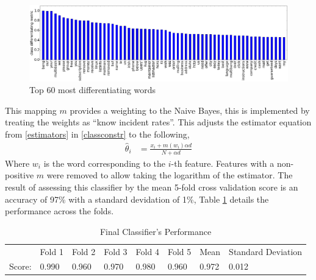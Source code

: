 \documentclass[12pt, a4paper]{article}
\begin{document}
  \begin{figure}[H]
    \caption{Top 60 most differentiating words}
    \label{wordprobsham}
    \vspace{-0.2cm}
    \centering
    \includegraphics[width=1\linewidth]{report_images/word_probs_diff}
  \end{figure}

	\begin{minipage}{\linewidth}

	This mapping $m$ provides a weighting to the Naive Bayes, this is implemented by treating the weights as ``know incident rates''. This adjusts the estimator equation  from \ref{estimators} in \ref{classconstr} to the following,
  \begin{align*}
		\hat{\theta}_i &= \frac{x_i + m(w_i) \alpha d}{N + \alpha d}
	\end{align*}
	Where $w_i$ is the word corresponding to the $i$-th feature. Features with a non-positive $m$ were removed to allow taking the logarithm of the estimator. The result of assessing this classifier by the mean 5-fold cross validation score is an accuracy of 97\% with a standard devidation of 1\%, Table \ref{finalperf} details the performance across the folds.

	\begin{table}[H]
	\centering
	\caption{Final Classifier's Performance}
	\label{finalperf}
	\begin{tabular}{llllllll}
     & Fold 1 & Fold 2 & Fold 3 & Fold 4 & Fold 5 & Mean & Standard Deviation \\
		 Score: & 0.990 & 0.960 & 0.970 & 0.980 & 0.960 & 0.972 & 0.012
	\end{tabular}
	\end{table}

	\end{minipage}
\end{document}
